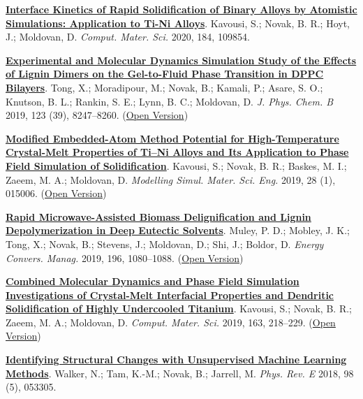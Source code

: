 \begin{cventries}
{\begin{cvitems}
        \item {\href{https://doi.org/10.1016/j.commatsci.2020.109854}{\textbf{Interface Kinetics of Rapid Solidification of Binary Alloys by Atomistic Simulations: Application to Ti-Ni Alloys}}. Kavousi, S.; Novak, B. R.; Hoyt, J.; Moldovan, D. \textit{Comput. Mater. Sci.} 2020, 184, 109854.}
        \item {\href{https://doi.org/10.1021/acs.jpcb.9b05525}{\textbf{Experimental and Molecular Dynamics Simulation Study of the Effects of Lignin Dimers on the Gel-to-Fluid Phase Transition in DPPC Bilayers}}. Tong, X.; Moradipour, M.; Novak, B.; Kamali, P.; Asare, S. O.; Knutson, B. L.; Rankin, S. E.; Lynn, B. C.; Moldovan, D. \textit{J. Phys. Chem. B} 2019, 123 (39), 8247–8260. (\href{https://par.nsf.gov/servlets/purl/10149222}{Open Version})}
        \item {\href{https://doi.org/10.1088/1361-651X/ab580c}{\textbf{Modified Embedded-Atom Method Potential for High-Temperature Crystal-Melt Properties of Ti–Ni Alloys and Its Application to Phase Field Simulation of Solidification}}. Kavousi, S.; Novak, B. R.; Baskes, M. I.; Zaeem, M. A.; Moldovan, D. \textit{Modelling Simul. Mater. Sci. Eng.} 2019, 28 (1), 015006. (\href{https://par.nsf.gov/servlets/purl/10208355}{Open Version})}
        \item {\href{https://doi.org/10.1016/j.enconman.2019.06.070}{\textbf{Rapid Microwave-Assisted Biomass Delignification and Lignin Depolymerization in Deep Eutectic Solvents}}. Muley, P. D.; Mobley, J. K.; Tong, X.; Novak, B.; Stevens, J.; Moldovan, D.; Shi, J.; Boldor, D. \textit{Energy Convers. Manag.} 2019, 196, 1080–1088. (\href{https://www.sciencedirect.com/science/article/am/pii/S0196890419307411}{Open Version})}
        \item {\href{https://doi.org/10.1016/j.commatsci.2019.03.024}{\textbf{Combined Molecular Dynamics and Phase Field Simulation Investigations of Crystal-Melt Interfacial Properties and Dendritic Solidification of Highly Undercooled Titanium}}. Kavousi, S.; Novak, B. R.; Zaeem, M. A.; Moldovan, D. \textit{Comput. Mater. Sci.} 2019, 163, 218–229. (\href{https://ipfs.io/ipfs/QmTY7FGs5p6zrExjUZ5bBpLohWdkmvvgtXZj1JuF9vV8Ay?filename=Combined_molecular_dynamics_and_phase_field_simulation_investigations_of_crystal-melt_interfacial_properties_and_dendritic_solidification_of_highly_undercooled_titanium.pdf}{Open Version})}
        \item {\href{https://doi.org/10.1103/PhysRevE.98.053305}{\textbf{Identifying Structural Changes with Unsupervised Machine Learning Methods}}. Walker, N.; Tam, K.-M.; Novak, B.; Jarrell, M. \textit{Phys. Rev. E} 2018, 98 (5), 053305.}

\end{cvitems}}
\end{cventries}
